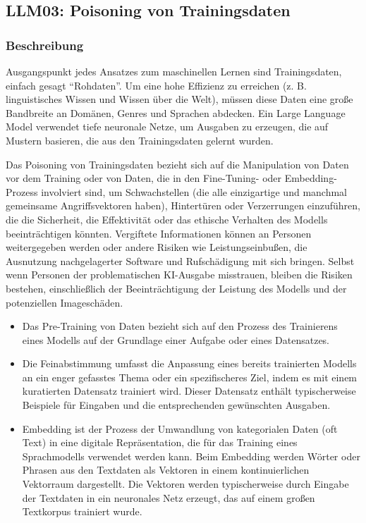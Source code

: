 \documentclass[
]{article}
\author{}
\date{}
\providecommand{\tightlist}{%
  \setlength{\itemsep}{0pt}\setlength{\parskip}{0pt}}
\begin{document}
\subsection{LLM03: Poisoning von
Trainingsdaten}\label{llm03-poisoning-von-trainingsdaten}

\subsubsection{Beschreibung}\label{beschreibung}

Ausgangspunkt jedes Ansatzes zum maschinellen Lernen sind
Trainingsdaten, einfach gesagt ``Rohdaten''. Um eine hohe Effizienz zu
erreichen (z. B. linguistisches Wissen und Wissen über die Welt), müssen
diese Daten eine große Bandbreite an Domänen, Genres und Sprachen
abdecken. Ein Large Language Model verwendet tiefe neuronale Netze, um
Ausgaben zu erzeugen, die auf Mustern basieren, die aus den
Trainingsdaten gelernt wurden.

Das Poisoning von Trainingsdaten bezieht sich auf die Manipulation von
Daten vor dem Training oder von Daten, die in den Fine-Tuning- oder
Embedding-Prozess involviert sind, um Schwachstellen (die alle
einzigartige und manchmal gemeinsame Angriffsvektoren haben),
Hintertüren oder Verzerrungen einzuführen, die die Sicherheit, die
Effektivität oder das ethische Verhalten des Modells beeinträchtigen
könnten. Vergiftete Informationen können an Personen weitergegeben
werden oder andere Risiken wie Leistungseinbußen, die Ausnutzung
nachgelagerter Software und Rufschädigung mit sich bringen. Selbst wenn
Personen der problematischen KI-Ausgabe misstrauen, bleiben die Risiken
bestehen, einschließlich der Beeinträchtigung der Leistung des Modells
und der potenziellen Imageschäden.

\begin{itemize}
\tightlist
\item
  Das Pre-Training von Daten bezieht sich auf den Prozess des
  Trainierens eines Modells auf der Grundlage einer Aufgabe oder eines
  Datensatzes.
\item
  Die Feinabstimmung umfasst die Anpassung eines bereits trainierten
  Modells an ein enger gefasstes Thema oder ein spezifischeres Ziel,
  indem es mit einem kuratierten Datensatz trainiert wird. Dieser
  Datensatz enthält typischerweise Beispiele für Eingaben und die
  entsprechenden gewünschten Ausgaben.
\item
  Embedding ist der Prozess der Umwandlung von kategorialen Daten (oft
  Text) in eine digitale Repräsentation, die für das Training eines
  Sprachmodells verwendet werden kann. Beim Embedding werden Wörter oder
  Phrasen aus den Textdaten als Vektoren in einem kontinuierlichen
  Vektorraum dargestellt. Die Vektoren werden typischerweise durch
  Eingabe der Textdaten in ein neuronales Netz erzeugt, das auf einem
  großen Textkorpus trainiert wurde.
\end{itemize}
\end{document}
